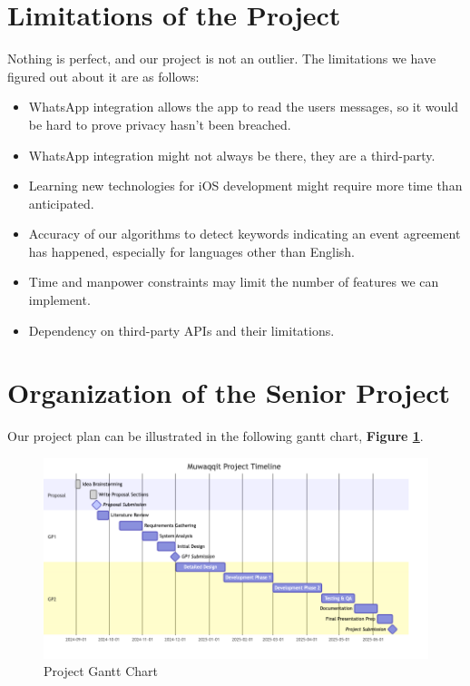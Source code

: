 \documentclass[12pt,a4paper]{report}
\begin{document}
\section{Limitations of the Project}

Nothing is perfect, and our project is not an outlier. The limitations we have figured out about it are as follows:

\begin{itemize}
    \item WhatsApp integration allows the app to read the users messages, so it would be hard to prove privacy hasn't been breached.
    \item WhatsApp integration might not always be there, they are a third-party.
    \item Learning new technologies for iOS development might require more time than anticipated.
    \item Accuracy of our algorithms to detect keywords indicating an event agreement has happened, especially for languages other than English.
    \item Time and manpower constraints may limit the number of features we can implement.
    \item Dependency on third-party APIs and their limitations.
\end{itemize}

\section{Organization of the Senior Project}

Our project plan can be illustrated in the following gantt chart, \textbf{Figure \ref{fig:project-gantt-chart}}.

\begin{figure}[!h]
    \centering
    \includegraphics[width=\textwidth]{images/gantt.png}
    \caption{Project Gantt Chart}
    \label{fig:project-gantt-chart}
\end{figure}
\end{document}
